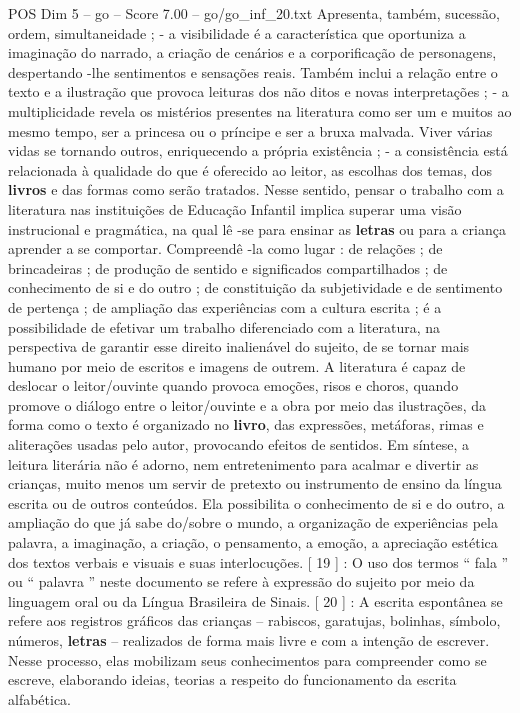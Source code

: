 \begin{textsample}{POS Dim 5 – go – Score 7.00 – go/go\_inf\_20.txt}
Apresenta, também, sucessão, ordem, simultaneidade ; - a visibilidade é a característica que oportuniza a imaginação do narrado, a criação de cenários e a corporificação de personagens, despertando -lhe sentimentos e sensações reais.
Também inclui a relação entre o texto e a ilustração que provoca leituras dos não ditos e novas interpretações ; - a multiplicidade revela os mistérios presentes na literatura como ser um e muitos ao mesmo tempo, ser a princesa ou o príncipe e ser a bruxa malvada.
Viver várias vidas se tornando outros, enriquecendo a própria existência ; - a consistência está relacionada à qualidade do que é oferecido ao leitor, as escolhas dos temas, dos \textbf{livros} e das formas como serão tratados.
Nesse sentido, pensar o trabalho com a literatura nas instituições de Educação Infantil implica superar uma visão instrucional e pragmática, na qual lê -se para ensinar as \textbf{letras} ou para a criança aprender a se comportar.
Compreendê -la como lugar : de relações ; de brincadeiras ; de produção de sentido e significados compartilhados ; de conhecimento de si e do outro ; de constituição da subjetividade e de sentimento de pertença ; de ampliação das experiências com a cultura escrita ; é a possibilidade de efetivar um trabalho diferenciado com a literatura, na perspectiva de garantir esse direito inalienável do sujeito, de se tornar mais humano por meio de escritos e imagens de outrem.
A literatura é capaz de deslocar o leitor/ouvinte quando provoca emoções, risos e choros, quando promove o diálogo entre o leitor/ouvinte e a obra por meio das ilustrações, da forma como o texto é organizado no \textbf{livro}, das expressões, metáforas, rimas e aliterações usadas pelo autor, provocando efeitos de sentidos.
Em síntese, a leitura literária não é adorno, nem entretenimento para acalmar e divertir as crianças, muito menos um servir de pretexto ou instrumento de ensino da língua escrita ou de outros conteúdos.
Ela possibilita o conhecimento de si e do outro, a ampliação do que já sabe do/sobre o mundo, a organização de experiências pela palavra, a imaginação, a criação, o pensamento, a emoção, a apreciação estética dos textos verbais e visuais e suas interlocuções. [ 19 ] : O uso dos termos “ fala ” ou “ palavra ” neste documento se refere à expressão do sujeito por meio da linguagem oral ou da Língua Brasileira de Sinais. [ 20 ] : A escrita espontânea se refere aos registros gráficos das crianças – rabiscos, garatujas, bolinhas, símbolo, números, \textbf{letras} – realizados de forma mais livre e com a intenção de escrever.
Nesse processo, elas mobilizam seus conhecimentos para compreender como se escreve, elaborando ideias, teorias a respeito do funcionamento da escrita alfabética.

\end{textsample}
